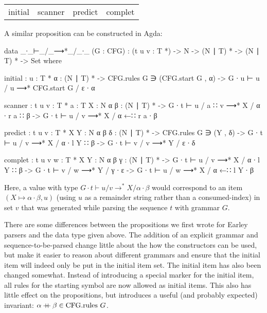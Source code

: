 		\begin{table}[h]
			\centering
			\begin{tabular}{cccc}
				initial & scanner & predict & complet
			\end{tabular}
		\end{table}

		A similar proposition can be constructed in Agda:

		\begin{code}
			data _∙_⊢_/_⟶*_/_∙_ (G : CFG) :
			  (t u v : T *) -> N -> (N ∣ T) * -> (N ∣ T) * -> Set where

			  initial : {u : T *} {α : (N ∣ T) *} ->
			    CFG.rules G ∋ (CFG.start G , α) ->
			    G ∙ u ⊢ u / u ⟶* CFG.start G / ε ∙ α

			  scanner : {t u v : T *} {a : T} {X : N} {α β : (N ∣ T) *} ->
			    G ∙ t ⊢ u / a ∷ v ⟶* X / α ∙ r a ∷ β ->
			      G ∙ t ⊢ u / v ⟶* X / α ←∷ r a ∙ β

			  predict : {t u v : T *} {X Y : N} {α β δ : (N ∣ T) *} ->
			    CFG.rules G ∋ (Y , δ) ->
			    G ∙ t ⊢ u / v ⟶* X / α ∙ l Y ∷ β ->
			      G ∙ t ⊢ v / v ⟶* Y / ε ∙ δ

			  complet : {t u v w : T *} {X Y : N} {α β γ : (N ∣ T) *} ->
			    G ∙ t ⊢ u / v ⟶* X / α ∙ l Y ∷ β ->
			    G ∙ t ⊢ v / w ⟶* Y / γ ∙ ε ->
			      G ∙ t ⊢ u / w ⟶* X / α ←∷ l Y ∙ β
		\end{code}

		Here, a value with type $G \cdot t \vdash u / v \rightarrow^* X /
		\alpha \cdot \beta$ would correspond to an item $(X \mapsto \alpha
		\cdot \beta, u)$ (using $u$ as a remainder string rather than a
		consumed-index) in set $v$ that was generated while parsing the
		sequence $t$ with grammar $G$.

		There are some differences between the propositions we first wrote for
		Earley parsers and the data type given above. The addition of an
		explicit grammar and sequence-to-be-parsed change little about the how
		the constructors can be used, but make it easier to reason about
		different grammars and ensure that the initial item will indeed only be
		put in the initial item set. The initial item has also been changed
		somewhat. Instead of introducing a special marker for the initial item,
		all rules for the starting symbol are now allowed as initial items.
		This also has little effect on the propositions, but introduces a
		useful (and probably expected) invariant: $\alpha \mathbin{{+}\mspace{-8mu}{+}} \beta \in
		\textrm{CFG.rules } G$.

		\newpage

